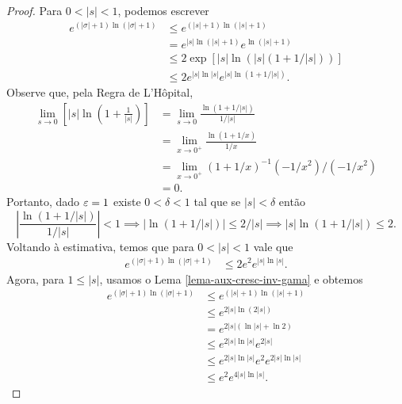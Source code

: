 \begin{proof}
        Para $0 < |s| < 1$, podemos escrever
        \begin{align*}
            e^{(|\sigma|+1)\ln(|\sigma|+1)} &\leq e^{(|s|+1)\ln(|s|+1)} \\
                                            &= e^{|s|\ln(|s|+1)}e^{\ln(|s|+1)} \\
                                            &\leq 2\exp\left[ |s|\ln\left( |s|(1 + 1/|s|) \right) \right] \\
                                            &\leq 2e^{|s|\ln|s|}e^{|s|\ln(1 + 1/|s|)}.
        \end{align*}
        Observe que, pela Regra de L'Hôpital,
        \begin{align*}
            \lim_{s\to 0} \left[ |s|\ln\left( 1 + \frac{1}{|s|} \right) \right]
            &= \lim_{s\to 0} \frac{\ln(1 + 1/|s|)}{1/|s|} \\
            &= \lim_{x\to 0^+} \frac{\ln(1 + 1/x)}{1/x} \\
            &= \lim_{x\to 0^+} (1 + 1/x)^{-1}(-1/x^2)/(-1/x^2) \\
            &= 0.
        \end{align*}
        Portanto, dado $\varepsilon=1$ existe $0<\delta<1$ tal que se $|s|<\delta$ então
        \[
        \left| \frac{\ln(1 + 1/|s|)}{1/|s|} \right| < 1 \implies |\ln(1 + 1/|s|)| \leq 2/|s| 
                                                        \implies |s|\ln(1+1/|s|) \leq 2.
        \]
        Voltando à estimativa, temos que para $0<|s|<1$ vale que
        \begin{align*}
            e^{(|\sigma|+1)\ln(|\sigma|+1)} &\leq 2e^2e^{|s|\ln|s|}.
        \end{align*}
        Agora, para $1\leq|s|$, usamos o Lema \ref{lema-aux-cresc-inv-gama}
        e obtemos
        \begin{align*}
            e^{(|\sigma|+1)\ln(|\sigma|+1)} &\leq e^{(|s|+1)\ln(|s|+1)} \\
                                            &\leq e^{2|s|\ln(2|s|)} \\
                                            &= e^{2|s|(\ln|s| + \ln 2)} \\
                                            &\leq e^{2|s|\ln|s|}e^{2|s|} \\
                                            &\leq e^{2|s|\ln|s|}e^2e^{2|s|\ln|s|} \\
                                            &\leq e^2e^{4|s|\ln|s|}.

\end{align*}
\end{proof}

